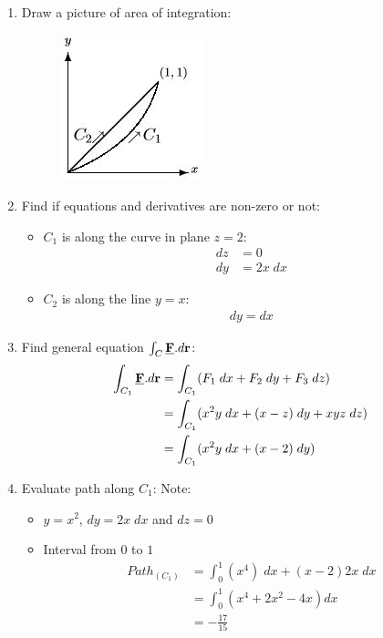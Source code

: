 \documentclass[10pt,a4paper]{article}
\begin{document}
\begin{enumerate}
    \item Draw a picture of area of integration:
    \begin{figure} [h!]
        \centering
        \includegraphics[scale=0.8]{Example1.JPG}
    \end{figure}
    \item Find if equations and derivatives are non-zero or not: 
    \begin{itemize}
        \item $C_1$ is along the curve in plane $z=2$:
        \begin{align*}
            dz &= 0 \\
            dy &= 2x\; dx
        \end{align*}
        \item $C_2$ is along the line $y=x$:
        \begin{align*}
            dy=dx
        \end{align*}
    \end{itemize}
    \item Find general equation $\int_{C}\textbf{\underline{F}}.d \textbf{r}$:
    \begin{align*}
        \int_{C_1}\textbf{\underline{F}}.d \textbf{r} &= \int_{C_1}(F_1\;dx + F_2\;dy + F_3\;dz)\\
        &= \int_{C_1} (x^2y \;dx + (x-z)\;dy + xyz\;dz) \\
        &= \int_{C_1} (x^2y \; dx + (x-2)\; dy)
    \end{align*}
    \item Evaluate path along $C_1$:
    Note:
    \begin{itemize}
        \item $y=x^2$, $dy=2x\;dx$ and $dz=0$
        \item Interval from $0$ to $1$
        \begin{align*}
            Path_{(C_1)} &= \int_0^1 (x^4)\;dx + (x-2)2x \; dx \\
            &= \int_0^1 (x^4 + 2x^2 - 4x)dx \\
            &= -\frac{17}{15}
        \end{align*}
    \end{itemize}


\end{enumerate}
\end{document}
